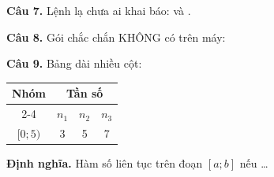 \documentclass[12pt,a4paper]{article}
\newcommand{\dinhnghia}[1]{\textbf{Định nghĩa.} #1}
\begin{document}
\textbf{Câu 7.} Lệnh lạ chưa ai khai báo:  và .

\textbf{Câu 8.} Gói chắc chắn KHÔNG có trên máy:
\begin{center}
\begin{khongtontai}
\end{khongtontai}
\end{center}

\textbf{Câu 9.} Bảng dài nhiều cột:
\begin{center}
\begin{tabular}{|c|c|c|c|}
\hline
\multirow{2}{*}{Nhóm} & \multicolumn{3}{c|}{Tần số} \\ \cline{2-4}
 & $n_1$ & $n_2$ & $n_3$ \\ \hline
$[0;5)$ & 3 & 5 & 7 \\ \hline
\end{tabular}
\end{center}

\dinhnghia{Hàm số liên tục trên đoạn $[a;b]$ nếu \ldots}
\end{document}
